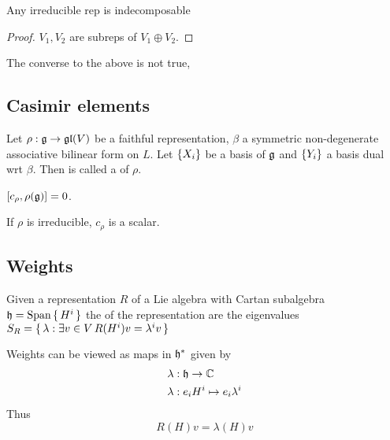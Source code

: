 \documentclass{article}
\begin{document}
\begin{prop}
	Any irreducible rep is indecomposable
\end{prop}
\begin{proof}
	$V_1, V_2 $ are subreps of $V_1 \oplus V_2$. 
\end{proof}

\begin{remark}
	The converse to the above is not true, 
\end{remark}

\subsection{Casimir elements}

\begin{definition}
	Let $\rho:\mf{g} \to \mf{gl}(V)$ be a faithful representation, $\beta$ a symmetric non-degenerate associative bilinear form on $L$. Let $\pbrace{X_i}$ be a basis of $\mf{g}$ and $\pbrace{Y_i}$ a basis dual wrt $\beta$. Then 
is called a  of $\rho$. 
\end{definition}

\begin{prop}
	$\comm[c_\rho]{\rho(\mf{g})}=0$. 
\end{prop}

\begin{corollary}
	If $\rho$ is irreducible, $c_\rho$ is a scalar.
\end{corollary}

\subsection{Weights}
\begin{definition}[Weights]
	Given a representation $R$ of a Lie algebra with Cartan subalgebra $\mf{h}=\spn\set{ H^i }$ the  of the representation are the eigenvalues $S_R=\set{ \lambda : \exists v\in V \, R(H^i)v=\lambda^i v}$
\end{definition}

\begin{fact}
	Weights can be viewed as maps in $\mf{h}^\ast$ given by 
	\begin{align*}
		\lambda &:\mf{h}\to\mbb{C} \\
		\lambda &: e_i H^i \mapsto e_i \lambda^i
	\end{align*}
	Thus 
	\[
	R(H)v=\lambda(H)v
	\]
\end{fact}
\end{document}
